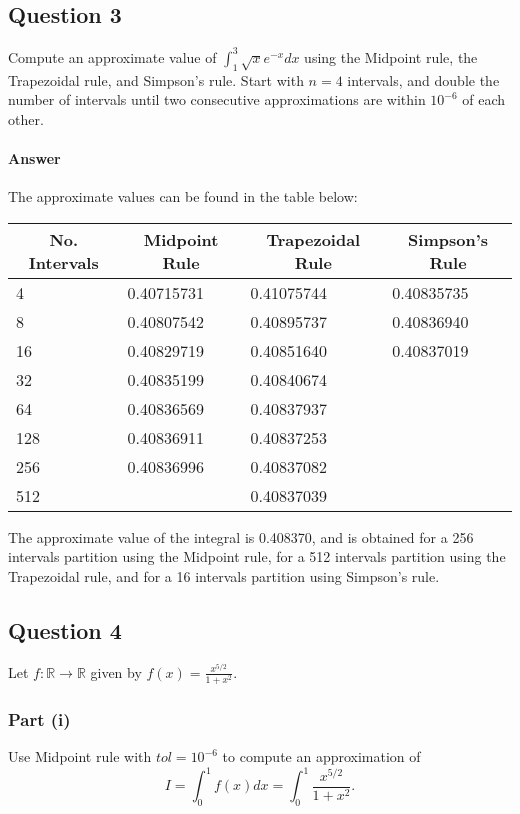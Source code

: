 \subsection{Question 3}
Compute an approximate value of $ \int_{1}^{3} \sqrt{x} e^{-x} dx $ using the
    Midpoint rule, the Trapezoidal rule, and Simpson's rule.
Start with $ n = 4 $ intervals, and double the number of intervals until two
    consecutive approximations are within $ 10^{-6} $ of each other.

\paragraph{Answer}
The approximate values can be found in the table below:
\begin{table}
    \center
    \begin{tabular}[c]{l|l|l|l}
        \hline
        \multicolumn{1}{c|}{No. Intervals} &
        \multicolumn{1}{c}{Midpoint Rule} &
        \multicolumn{1}{c}{Trapezoidal Rule} &
        \multicolumn{1}{c}{Simpson's Rule} \\
        \hline
        4   & 0.40715731 & 0.41075744 & 0.40835735 \\
        8   & 0.40807542 & 0.40895737 & 0.40836940 \\
        16  & 0.40829719 & 0.40851640 & 0.40837019 \\
        32  & 0.40835199 & 0.40840674 & \\
        64  & 0.40836569 & 0.40837937 & \\
        128 & 0.40836911 & 0.40837253 & \\
        256 & 0.40836996 & 0.40837082 & \\
        512 &            & 0.40837039 & \\
        \hline
    \end{tabular}
\end{table}
The approximate value of the integral is 0.408370, and is obtained for a 256
    intervals partition using the Midpoint rule, for a 512 intervals partition
    using the Trapezoidal rule, and for a 16 intervals partition using
    Simpson's rule.

\subsection{Question 4}
Let $ f : \mathbb{R} \rightarrow \mathbb{R} $ given by
    $ f(x) = \frac{x^{5/2}}{1 + x^2} $.

\subsubsection{Part (i)}
Use Midpoint rule with $ tol = 10^{-6} $ to compute an approximation of
\begin{equation*}
    I = \int_{0}^{1} f(x) dx = \int_{0}^{1} \frac{x^{5/2}}{1 + x^2}.
\end{equation*}

